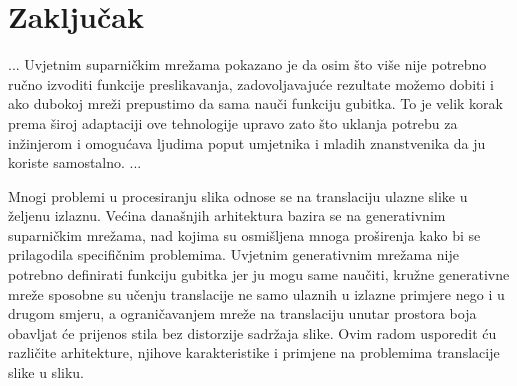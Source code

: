 \documentclass[lmodern, utf8, seminar]{fer}
\begin{document}
\chapter{Zaključak}
...
Uvjetnim suparničkim mrežama pokazano je da osim što više nije potrebno ručno izvoditi funkcije preslikavanja, zadovoljavajuće rezultate možemo dobiti i ako dubokoj mreži prepustimo da sama nauči funkciju gubitka. To je velik korak prema široj adaptaciji ove tehnologije upravo zato što uklanja potrebu za inžinjerom i omogućava ljudima poput umjetnika i mladih znanstvenika da ju koriste samostalno.
...






\begin{sazetak}
Mnogi problemi u procesiranju slika odnose se na translaciju ulazne slike u željenu izlaznu. Većina današnjih arhitektura bazira se na generativnim suparničkim mrežama, nad kojima su osmišljena mnoga proširenja kako bi se prilagodila specifičnim problemima. Uvjetnim generativnim mrežama nije potrebno definirati funkciju gubitka jer ju mogu same naučiti, kružne generativne mreže sposobne su učenju translacije ne samo ulaznih u izlazne primjere nego i u drugom smjeru, a ograničavanjem mreže na translaciju unutar prostora boja obavljat će prijenos stila bez distorzije sadržaja slike. Ovim radom usporedit ću različite arhitekture, njihove karakteristike i primjene na problemima translacije slike u sliku.

\end{sazetak}

\begin{abstract}

\end{abstract}
\end{document}
